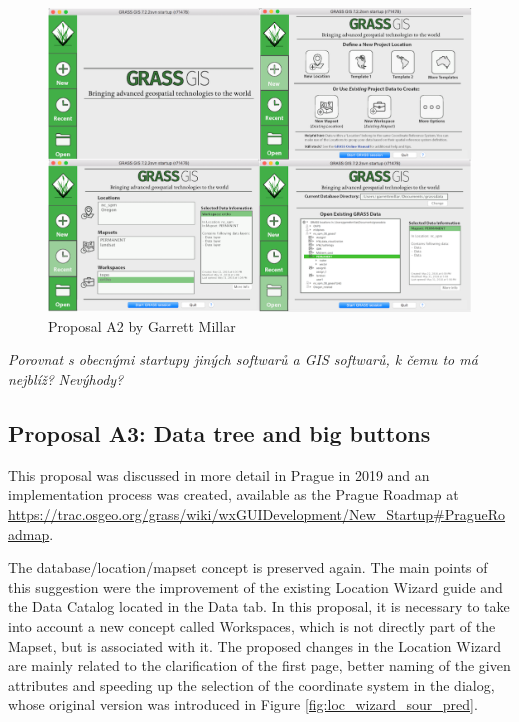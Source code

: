 \documentclass[a4paper,10pt,twoside]{article}
\begin{document}
\vspace{0.3cm}
\begin{figure}[hbt!] 
\begin{center}
\includegraphics[width=15cm]{pictures/proposalA2.png} 
\caption[Proposal A2 by Garrett Millar]{Proposal A2 by Garrett Millar}
\label{fig:proposalA2}
\end{center}
\end{figure}

\textit{\color{red} Porovnat s obecnými startupy jiných softwarů a GIS softwarů, k čemu to má nejblíž?}
\textit{\color{red} Nevýhody?}

\subsection{Proposal A3: Data tree and big buttons}

This proposal was discussed in more detail in Prague in 2019 and an implementation process was created, available as the Prague Roadmap at \url{https://trac.osgeo.org/grass/wiki/wxGUIDevelopment/New\_Startup\#PragueRoadmap}.

The database/location/mapset concept is preserved again. The main points of this suggestion were the improvement of the existing Location Wizard guide and the Data Catalog located in the Data tab. In this proposal, it is necessary to take into account a new concept called Workspaces, which is not directly part of the Mapset, but is associated with it. The proposed changes in the Location Wizard are mainly related to the clarification of the first page, better naming of the given attributes and speeding up the selection of the coordinate system in the dialog, whose original version was introduced in Figure \ref{fig:loc_wizard_sour_pred}.
\end{document}
